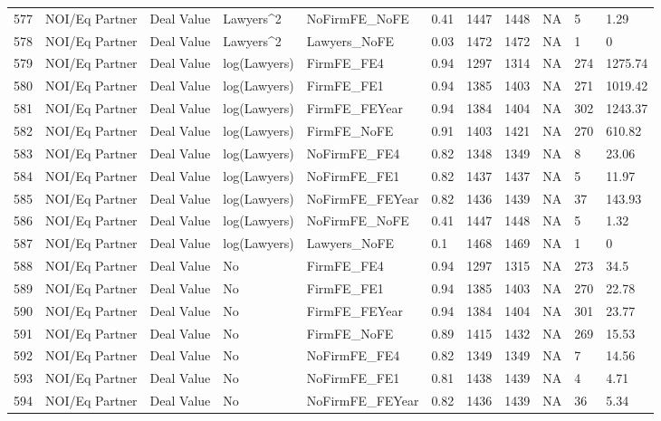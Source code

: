 \begin{table}[ht]
\begin{tabular}{rllllllllll}
  577 & NOI/Eq Partner & Deal Value & Lawyers^2 & NoFirmFE\_NoFE & 0.41 & 1447 & 1448 & NA & 5 & 1.29 \\ 
  578 & NOI/Eq Partner & Deal Value & Lawyers^2 & Lawyers\_NoFE & 0.03 & 1472 & 1472 & NA & 1 & 0 \\ 
  579 & NOI/Eq Partner & Deal Value & log(Lawyers) & FirmFE\_FE4 & 0.94 & 1297 & 1314 & NA & 274 & 1275.74 \\ 
  580 & NOI/Eq Partner & Deal Value & log(Lawyers) & FirmFE\_FE1 & 0.94 & 1385 & 1403 & NA & 271 & 1019.42 \\ 
  581 & NOI/Eq Partner & Deal Value & log(Lawyers) & FirmFE\_FEYear & 0.94 & 1384 & 1404 & NA & 302 & 1243.37 \\ 
  582 & NOI/Eq Partner & Deal Value & log(Lawyers) & FirmFE\_NoFE & 0.91 & 1403 & 1421 & NA & 270 & 610.82 \\ 
  583 & NOI/Eq Partner & Deal Value & log(Lawyers) & NoFirmFE\_FE4 & 0.82 & 1348 & 1349 & NA & 8 & 23.06 \\ 
  584 & NOI/Eq Partner & Deal Value & log(Lawyers) & NoFirmFE\_FE1 & 0.82 & 1437 & 1437 & NA & 5 & 11.97 \\ 
  585 & NOI/Eq Partner & Deal Value & log(Lawyers) & NoFirmFE\_FEYear & 0.82 & 1436 & 1439 & NA & 37 & 143.93 \\ 
  586 & NOI/Eq Partner & Deal Value & log(Lawyers) & NoFirmFE\_NoFE & 0.41 & 1447 & 1448 & NA & 5 & 1.32 \\ 
  587 & NOI/Eq Partner & Deal Value & log(Lawyers) & Lawyers\_NoFE & 0.1 & 1468 & 1469 & NA & 1 & 0 \\ 
  588 & NOI/Eq Partner & Deal Value & No & FirmFE\_FE4 & 0.94 & 1297 & 1315 & NA & 273 & 34.5 \\ 
  589 & NOI/Eq Partner & Deal Value & No & FirmFE\_FE1 & 0.94 & 1385 & 1403 & NA & 270 & 22.78 \\ 
  590 & NOI/Eq Partner & Deal Value & No & FirmFE\_FEYear & 0.94 & 1384 & 1404 & NA & 301 & 23.77 \\ 
  591 & NOI/Eq Partner & Deal Value & No & FirmFE\_NoFE & 0.89 & 1415 & 1432 & NA & 269 & 15.53 \\ 
  592 & NOI/Eq Partner & Deal Value & No & NoFirmFE\_FE4 & 0.82 & 1349 & 1349 & NA & 7 & 14.56 \\ 
  593 & NOI/Eq Partner & Deal Value & No & NoFirmFE\_FE1 & 0.81 & 1438 & 1439 & NA & 4 & 4.71 \\ 
  594 & NOI/Eq Partner & Deal Value & No & NoFirmFE\_FEYear & 0.82 & 1436 & 1439 & NA & 36 & 5.34 \\ 

\end{tabular}
\end{table}

